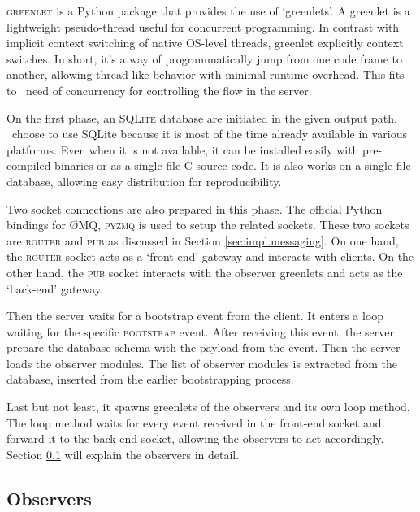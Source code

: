 \textsc{greenlet} is a Python package that provides the use of `greenlets'.
A greenlet is a lightweight pseudo-thread useful for concurrent programming.
In contrast with implicit context switching of native OS-level threads, greenlet explicitly context switches.
In short, it's a way of programmatically jump from one code frame to another, allowing thread-like behavior with minimal runtime overhead.
This fits to \firstposs~need of concurrency for controlling the flow in the server.

On the first phase, an \textsc{SQLite} database are initiated in the given output path.
\First~choose to use SQLite because it is most of the time already available in various platforms.
Even when it is not available, it can be installed easily with pre-compiled binaries or as a single-file C source code.
It is also works on a single file database, allowing easy distribution for reproducibility.

Two socket connections are also prepared in this phase.
The official Python bindings for \O MQ, \textsc{pyzmq} is used to setup the related sockets.
These two sockets are \textsc{router} and \textsc{pub} as discussed in Section \ref{sec:impl.messaging}.
On one hand, the \textsc{router} socket acts as a `front-end' gateway and interacts with clients.
On the other hand, the \textsc{pub} socket interacts with the observer greenlets and acts as the `back-end' gateway.

Then the server waits for a bootstrap event from the client.
It enters a loop waiting for the specific \textsc{bootstrap} event.
After receiving this event, the server prepare the database schema with the payload from the event.
Then the server loads the observer modules.
The list of observer modules is extracted from the database, inserted from the earlier bootstrapping process.

Last but not least, it spawns greenlets of the observers and its own loop method.
The loop method waits for every event received in the front-end socket and forward it to the back-end socket, allowing the observers to act accordingly.
Section \ref{sec:impl.observers} will explain the observers in detail.



\subsection{Observers}
\label{sec:impl.observers}

